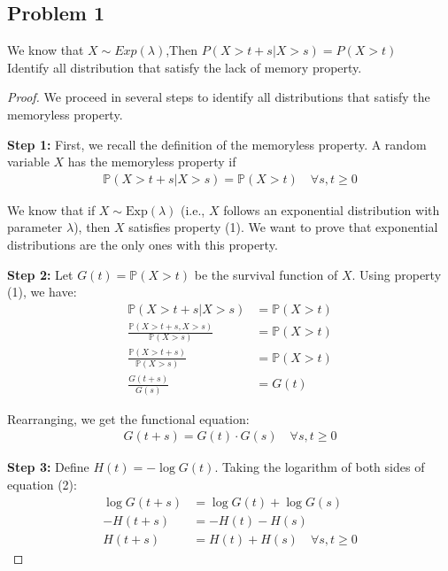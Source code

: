 \subsection*{Problem 1}
We know that $ X\sim Exp(\lambda) $,Then $ P(X>t+s|X> s)=P(X>t) $
\\Identify all distribution that satisfy the lack of memory property.
\begin{proof}
    We proceed in several steps to identify all distributions that satisfy the memoryless property.
    
    \textbf{Step 1:} First, we recall the definition of the memoryless property. A random variable $X$ has the memoryless property if
    \begin{align}
    \mathbb{P}(X > t+s | X > s) = \mathbb{P}(X > t) \quad \forall s, t \geq 0 \tag{1}
    \end{align}
    
    We know that if $X \sim \text{Exp}(\lambda)$ (i.e., $X$ follows an exponential distribution with parameter $\lambda$), then $X$ satisfies property (1). We want to prove that exponential distributions are the only ones with this property.
    
    \textbf{Step 2:} Let $G(t) = \mathbb{P}(X > t)$ be the survival function of $X$. Using property (1), we have:
    \begin{align*}
    \mathbb{P}(X > t+s | X > s) &= \mathbb{P}(X > t) \\
    \frac{\mathbb{P}(X > t+s, X > s)}{\mathbb{P}(X > s)} &= \mathbb{P}(X > t) \\
    \frac{\mathbb{P}(X > t+s)}{\mathbb{P}(X > s)} &= \mathbb{P}(X > t) \\
    \frac{G(t+s)}{G(s)} &= G(t)
    \end{align*}
    
    Rearranging, we get the functional equation:
    \begin{align}
    G(t+s) = G(t) \cdot G(s) \quad \forall s, t \geq 0 \tag{2}
    \end{align}
    
    \textbf{Step 3:} Define $H(t) = -\log G(t)$. Taking the logarithm of both sides of equation (2):
    \begin{align}
    \log G(t+s) &= \log G(t) + \log G(s) \\
    -H(t+s) &= -H(t) - H(s) \\
    H(t+s) &= H(t) + H(s) \quad \forall s, t \geq 0 \tag{3}
    \end{align}
    

\end{proof}
